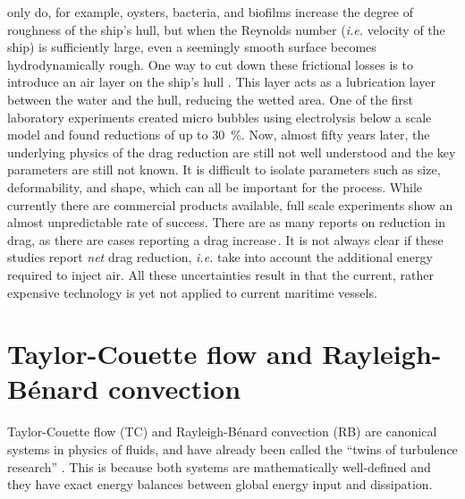 only do, for example, oysters, bacteria, and biofilms increase the degree of
roughness of the ship's hull, but when the Reynolds number (\textit{i.e.}
velocity of the ship) is sufficiently large, even a seemingly smooth surface
becomes hydrodynamically rough. One way to cut down these frictional losses is
to introduce an air layer on the ship's hull \citep{Verschoof2018b}. This
layer acts as a lubrication layer between the water and the hull, reducing the
wetted area. One of the first laboratory experiments created micro bubbles
using electrolysis below a scale model \citep{mcCormick1973} and found
reductions of up to \SI{30}{\percent}. Now, almost fifty years later, the
underlying physics of the drag reduction are still not well understood and the
key parameters are still not known.  It is difficult to isolate parameters
such as size, deformability, and shape, which can all be important for the
process.  While currently there are commercial products available, full scale
experiments show an almost unpredictable rate of success. There are as many
reports on reduction in drag, as there are cases reporting a drag
increase\,\cite{Murai2014}. It
is not always clear if these studies report \emph{net} drag reduction,
\textit{i.e.} take into account the additional energy required to inject air.
All these uncertainties result in that the current, rather expensive
technology is yet not applied to current maritime vessels. 

\section*{Taylor-Couette flow and Rayleigh-B\'enard convection}
Taylor-Couette flow (TC) and Rayleigh-B\'enard convection (RB) are 
canonical systems in physics of fluids, and have already been called the
``twins of turbulence research'' \citep{Busse2012}. This is because both
systems are mathematically well-defined and they have exact energy balances
between global energy input and dissipation.

